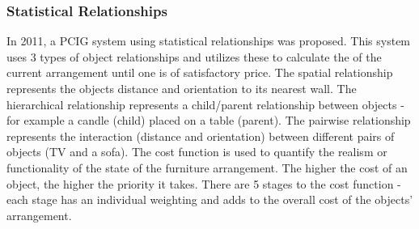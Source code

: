 \subsubsection{Statistical Relationships}
In 2011, a PCIG system using statistical relationships was proposed\cite{make-it-home}\cite{youtube:make-it-home}. This system uses 3 types of object relationships and utilizes these to calculate the  of the current arrangement until one is of satisfactory price. The spatial relationship represents the objects distance and orientation to its nearest wall. The hierarchical relationship represents a child/parent relationship between objects - for example a candle (child) placed on a table (parent). The pairwise relationship represents the interaction (distance and orientation) between different pairs of objects (TV and a sofa).
The cost function is used to quantify the realism or functionality of the state of the furniture arrangement. The higher the cost of an object, the higher the priority it takes. 
There are 5 stages to the cost function - each stage has an individual weighting and adds to the overall cost of the objects' arrangement.
